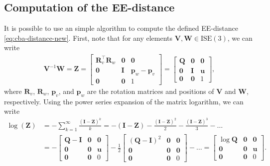 \subsection{Computation of the EE-distance}
It is possible to use an simple algorithm to compute the defined EE-distance \eqref{eq:cba-distance-new}. First, note that for any elements $\mathbf{V}, \mathbf{W}\in\text{ISE}(3)$, we can write
\begin{align}
    \mathbf{V}^{-1}\mathbf{W} = \mathbf{Z} = \begin{bmatrix}
        \mathbf{R}_v^\top\mathbf{R}_w & \mathbf{0} & \mathbf{0}\\
        \mathbf{0} & \mathbf{I} & \mathbf{p}_w - \mathbf{p}_v\\
        \mathbf{0} & \mathbf{0} & 1
    \end{bmatrix} = \begin{bmatrix}
        \mathbf{Q} & \mathbf{0} & \mathbf{0}\\
        \mathbf{0} & \mathbf{I} & \mathbf{u}\\
        \mathbf{0} & \mathbf{0} & 1
    \end{bmatrix},
\end{align}
where $\mathbf{R}_v$, $\mathbf{R}_w$, $\mathbf{p}_v$, and $\mathbf{p}_w$ are the rotation matrices and positions of $\mathbf{V}$ and $\mathbf{W}$, respectively. Using the power series expansion of the matrix logarithm, we can write
\begin{align}
    \log(\mathbf{Z}) &= -\sum_{k=1}^\infty \frac{(\mathbf{I} - \mathbf{Z})^k}{k} = -(\mathbf{I} - \mathbf{Z}) - \frac{(\mathbf{I} - \mathbf{Z})^2}{2} - \frac{(\mathbf{I} - \mathbf{Z})^3}{3} - \dots\\
    &= -\begin{bmatrix}
        \mathbf{Q} - \mathbf{I} & \mathbf{0} & \mathbf{0}\\
        \mathbf{0} & \mathbf{0} & \mathbf{u}\\
        \mathbf{0} & \mathbf{0} & 0
    \end{bmatrix} - \frac{1}{2}\begin{bmatrix}
        (\mathbf{Q} - \mathbf{I})^2 & \mathbf{0} & \mathbf{0}\\
        \mathbf{0} & \mathbf{0} & \mathbf{0}\\
        \mathbf{0} & \mathbf{0} & 0
    \end{bmatrix} - \dots= \begin{bmatrix}
        \log\mathbf{Q} & \mathbf{0} & \mathbf{0}\\
        \mathbf{0} & \mathbf{0} & \mathbf{u}\\
        \mathbf{0} & \mathbf{0} & 0
    \end{bmatrix}.
\end{align}
